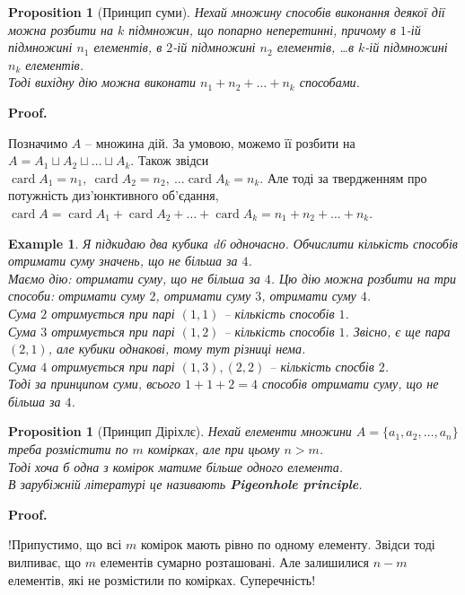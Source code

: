 \documentclass[a4paper, 14pt]{extarticle}
\makeatletter
\theoremstyle{theoremdd}
\theoremstyle{theoremdd}
\theoremstyle{theoremdd}
\theoremstyle{theoremdd}
\theoremstyle{theoremdd}
\newtheorem{example}[theorem]{Example}
\theoremstyle{theoremdd}
\theoremstyle{theoremdd}
\theoremstyle{theoremdd}
\theoremstyle{theoremdd}
\newtheorem{proposition}[theorem]{Proposition}
\theoremstyle{theoremdd}
\theoremstyle{theoremdd}
\theoremstyle{theoremdd}
\theoremstyle{theoremdd}
\theoremstyle{theoremdd}
\theoremstyle{theoremdd}
\renewenvironment{proof}[1][Proof.\\]{\par
\pushQED{\hfill \qed}%
\normalfont \topsep6\p@\@plus6\p@\relax
\trivlist
\item\relax
{\bfseries
#1\@addpunct{.}}\hspace\labelsep\ignorespaces
}{%
\popQED\endtrivlist\@endpefalse
}
\DeclareMathOperator{\card}{card}
\makeatother
\begin{document}
\begin{proposition}[Принцип суми]
Нехай множину способів виконання деякої дії можна розбити на $k$ підмножин, що попарно неперетинні, причому в $1$-ій підмножині $n_1$ елементів, в $2$-ій підмножині $n_2$ елементів, \dots в $k$-ій підмножині $n_k$ елементів.\\
Тоді вихідну дію можна виконати $n_1 + n_2 + \dots + n_k$ способами.
\end{proposition}

\begin{proof}
Позначимо $A$ -- множина дій. За умовою, можемо її розбити на $A = A_1 \sqcup A_2 \sqcup \dots \sqcup A_k$. Також звідси $\card A_1 = n_1,\ \card A_2 = n_2,\ \dots \card A_k = n_k$. Але тоді за твердженням про потужність диз'юнктивного об'єдання,\\
$\card A = \card A_1 + \card A_2 + \dots + \card A_k = n_1 + n_2 + \dots + n_k$.
\end{proof}

\begin{example}
Я підкидаю два кубика d6 одночасно. Обчислити кількість способів отримати суму значень, що не більша за $4$.\\
Маємо дію: отримати суму, що не більша за $4$. Цю дію можна розбити на три способи: отримати суму $2$, отримати суму $3$, отримати суму $4$.\\
Сума $2$ отримується при парі $(1,1)$ -- кількість способів $1$.\\
Сума $3$ отримується при парі $(1,2)$ -- кількість способів $1$. Звісно, є ще пара $(2,1)$, але кубики однакові, тому тут різниці нема.\\
Сума $4$ отримується при парі $(1,3),(2,2)$ -- кількість спосбів $2$.\\
Тоді за принципом суми, всього $1 + 1 + 2 = 4$ способів отримати суму, що не більша за $4$.
\end{example}

\begin{proposition}[Принцип Діріхлє]
Нехай елементи множини $A = \{a_1,a_2,\dots,a_n\}$ треба розмістити по $m$ комірках, але при цьому $n > m$.\\
Тоді хоча б одна з комірок матиме більше одного елемента.\\
В зарубіжній літературі це називають \textbf{Pigeonhole principle}.
\end{proposition}

\begin{proof}
!Припустимо, що всі $m$ комірок мають рівно по одному елементу. Звідси тоді вилпиває, що $m$ елементів сумарно розташовані. Але залишилися $n-m$ елементів, які не розмістили по комірках. Суперечність!
\end{proof}
\end{document}
